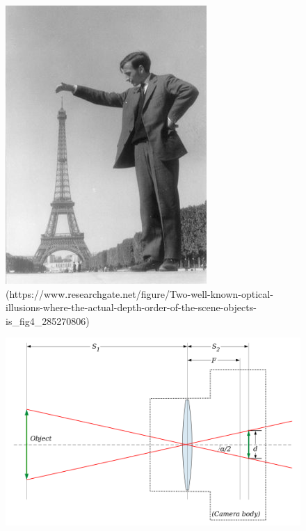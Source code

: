 \begin{figure} [H]
	\centering
		\begin{minipage}{.4\textwidth}
			\centering
			\captionsetup{width=.9\linewidth}
			\includegraphics[width=0.8\linewidth]{../Images/Theoretical-Background/Two-well-known-optical-illusions-where-the-actual-depth-order-of-the-scene-objects-is.jpg}\\
			\decoRule
			(https://www.researchgate.net/figure/Two-well-known-optical-illusions-where-the-actual-depth-order-of-the-scene-objects-is_fig4_285270806)
			\label{fig:depth-ambiguity-optical-illusion}
		\end{minipage}%
		\begin{minipage}{.6\textwidth}
			\centering
			\includegraphics[width=\linewidth]{../Images/Theoretical-Background/Lens_angle_of_view.png}\\

\end{minipage}
\end{figure}
